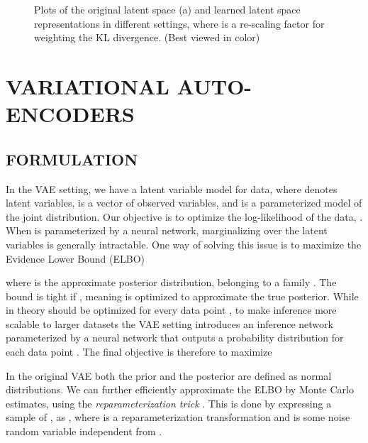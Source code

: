 \documentclass[letterpaper]{article}
\begin{document}
\begin{figure*}[t!]
\centering
\caption{Plots of the original latent space (a) and learned latent space representations in different settings, where  is a re-scaling factor for weighting the KL divergence. (Best viewed in color)}
\label{fig:exp-toy1}
\end{figure*}

\section{VARIATIONAL AUTO-ENCODERS}
\label{sec:vae}

\subsection{FORMULATION} \label{subsec:formulation}
In the VAE setting, we have a latent variable model for data, where  denotes latent variables,  is a vector of  observed variables, and  is a parameterized model of the joint distribution. Our objective is to optimize the log-likelihood of the data, . When  is parameterized by a neural network, marginalizing over the latent variables is generally intractable. One way of solving this issue is to maximize the Evidence Lower Bound (ELBO)

where  is the approximate posterior distribution, belonging to a family . The bound is tight if , meaning  is optimized to approximate the true posterior. While in theory  should be optimized for every data point , to make inference more scalable to larger datasets the VAE setting introduces an inference network  parameterized by a neural network that outputs a probability distribution for each data point . The final objective is therefore to maximize

In the original VAE both the prior and the posterior are defined as normal distributions. We can further efficiently approximate the ELBO by Monte Carlo estimates, using the \textit{reparameterization trick} \citep{journals/corr/KingmaW13, rezende2014stochastic}. This is done by expressing a sample of , as , where  is a reparameterization transformation and  is some noise random variable independent from .
\end{document}
